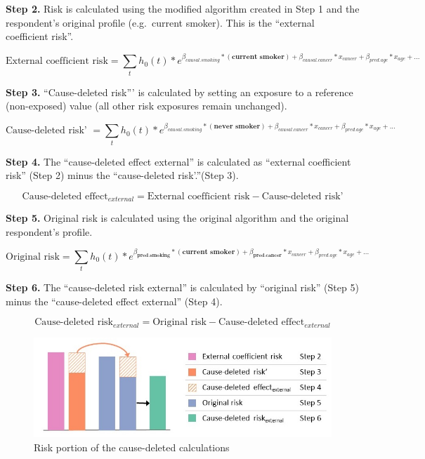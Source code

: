 \documentclass[]{book}
\begin{document}
\textbf{Step 2.} Risk is calculated using the modified algorithm created
in Step 1 and the respondent's original profile (e.g.~current smoker).
This is the ``external coefficient risk''.

\[ \text{External coefficient risk} = \sum_t h_0(t) * e^{\beta_{causal.smoking}* {(\textbf{current smoker})} + \beta_{causal.cancer}*x_{cancer} + \beta_{pred.age}*x_{age} +...}  \]

\textbf{Step 3.} ``Cause-deleted risk''' is calculated by setting an
exposure to a reference (non-exposed) value (all other risk exposures
remain unchanged).

\[ \text{Cause-deleted risk' } = \sum_t h_0(t) * e^{\beta_{causal.smoking}* {(\textbf{never smoker})} + \beta_{causal.cancer}*x_{cancer} + \beta_{pred.age}*x_{age} +...}  \]

\textbf{Step 4.} The ``cause-deleted effect external'' is calculated as
``external coefficient risk'' (Step 2) minus the ``cause-deleted
risk'.''(Step 3).

\[\text{Cause-deleted effect}_{external} = \text{External coefficient risk} - \text{Cause-deleted risk'}\]

\textbf{Step 5.} Original risk is calculated using the original
algorithm and the original respondent's profile.

\[ \text{Original risk} = \sum_t h_0(t) * e^{{\beta_\textbf{pred.smoking}}*{(\textbf{current smoker})}+{\beta_\textbf{pred.cancer}}*x_{cancer} + \beta_{pred.age}*x_{age} +...}  \]

\textbf{Step 6.} The ``cause-deleted risk external'' is calculated by
``original risk'' (Step 5) minus the ``cause-deleted effect external''
(Step 4).

\[\text{Cause-deleted risk}_{ external} = \text{Original risk} - \text{Cause-deleted effect}_{external}\]

\begin{figure}

{\centering \includegraphics{Method2 only -cbf} 

}

\caption{Risk portion of the cause-deleted calculations}\label{fig:unnamed-chunk-11}
\end{figure}
\end{document}
